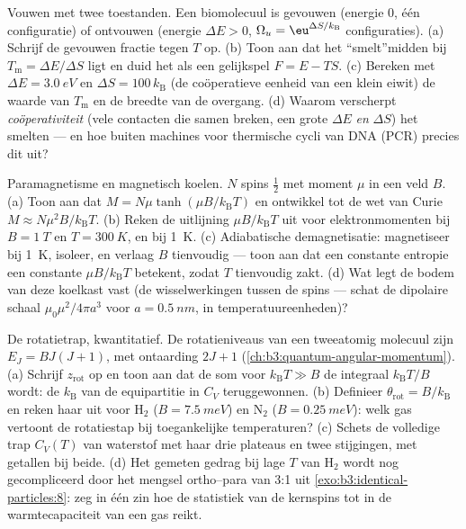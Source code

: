 \begin{exercise}[$\star\star\star$]\label{exo:b3:canonical-ensemble:10}
Vouwen met twee toestanden. Een biomolecuul is gevouwen (energie $0$, één
configuratie) of ontvouwen (energie $\Delta E > 0$, $\Omega_u =
\eu^{\Delta S/k_{\text{B}}}$ configuraties). (a) Schrijf de gevouwen
fractie tegen $T$ op. (b) Toon aan dat het ``smelt''midden bij
$T_{\text{m}} = \Delta E/\Delta S$ ligt en duid het als een gelijkspel $F = E -
TS$. (c) Bereken met $\Delta E = \qty{3.0}{eV}$ en $\Delta S =
100\,k_{\text{B}}$ (de coöperatieve eenheid van een klein eiwit) de waarde
van $T_{\text{m}}$ en de breedte van de overgang. (d) Waarom verscherpt
\emph{coöperativiteit} (vele contacten die samen breken, een grote $\Delta E$ \emph{en} $\Delta S$) het smelten --- en hoe buiten machines voor
thermische cycli van DNA (PCR) precies dit uit?
\end{exercise}

\begin{exercise}[$\star\star\star$]\label{exo:b3:canonical-ensemble:11}
Paramagnetisme en magnetisch koelen. $N$ spins $\tfrac12$ met moment $\mu$
in een veld $B$. (a) Toon aan dat $M = N\mu\tanh(\mu B/k_{\text{B}}T)$ en
ontwikkel tot de wet van Curie $M \approx N\mu^2B/k_{\text{B}}T$. (b)
Reken de uitlijning $\mu B/k_{\text{B}}T$ uit voor elektronmomenten bij $B = \qty{1}{T}$ en $T = \qty{300}{K}$, en bij \qty{1}{K}. (c) Adiabatische
demagnetisatie: magnetiseer bij \qty{1}{K}, isoleer, en verlaag $B$
tienvoudig --- toon aan dat een constante entropie een constante $\mu B/k_{\text{B}}T$ betekent, zodat $T$ tienvoudig zakt. (d) Wat legt de
bodem van deze koelkast vast (de wisselwerkingen tussen de spins --- schat
de dipolaire schaal $\mu_0\mu^2/4\pi a^3$ voor $a =
\qty{0.5}{nm}$, in
temperatuureenheden)?
\end{exercise}

\begin{exercise}[$\star\star\star$]\label{exo:b3:canonical-ensemble:12}
De rotatietrap, kwantitatief. De rotatieniveaus van een tweeatomig
molecuul zijn $E_J = BJ(J+1)$, met ontaarding $2J + 1$
(\cref{ch:b3:quantum-angular-momentum}). (a) Schrijf $z_{\text{rot}}$ op
en toon aan dat de som voor $k_{\text{B}}T \gg B$ de integraal
$k_{\text{B}}T/B$ wordt: de $k_{\text{B}}$ van de equipartitie in $C_V$
teruggewonnen. (b) Definieer $\theta_{\text{rot}} =
B/k_{\text{B}}$ en
reken haar uit voor H$_2$ ($B = \qty{7.5}{meV}$) en N$_2$ ($B = \qty{0.25}{meV}$): welk gas vertoont de rotatiestap bij toegankelijke
temperaturen? (c) Schets de volledige trap $C_V(T)$ van waterstof met haar
drie plateaus en twee stijgingen, met getallen bij beide. (d) Het gemeten
gedrag bij lage $T$ van H$_2$ wordt nog gecompliceerd door het mengsel
ortho--para van 3:1 uit \cref{exo:b3:identical-particles:8}: zeg in één zin
hoe de statistiek van de kernspins tot in de warmtecapaciteit van een gas
reikt.
\end{exercise}

